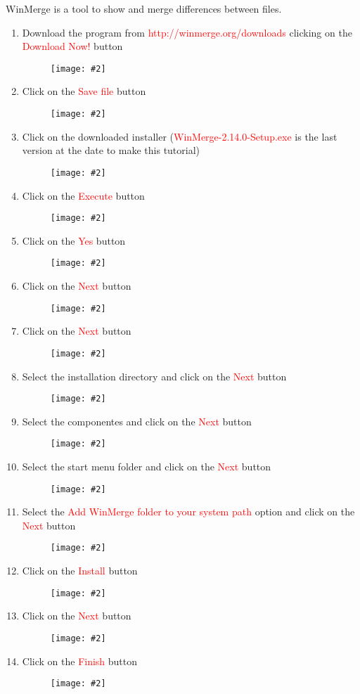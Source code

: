 \documentclass[a4paper]{article}
\newcommand{\FIG}[2]
{
	\begin{figure}[ht!]
	\centering
	\texttt{[image: \#2]}
	\end{figure}
}
\newcommand{\FIGUREB}[1]{\FIG{0.26}{#1}}
\newcommand{\RED}[1] {\textcolor{red}{#1}}
\begin{document}
WinMerge is a tool to show and merge differences between files.

\begin{enumerate}

\item Download the program from \RED{http://winmerge.org/downloads} clicking on
the \RED{Download Now!} button
\FIGUREB{Winmerge-1.png.eps}

\clearpage

\item Click on the \RED{Save file} button
\FIGUREB{Winmerge-2.png.eps}

\item Click on the downloaded installer (\RED{WinMerge-2.14.0-Setup.exe} is the
last version at the date to make this tutorial)
\FIGUREB{Winmerge-3.png.eps}

\clearpage

\item Click on the \RED{Execute} button
\FIGUREB{Winmerge-4.png.eps}

\item Click on the \RED{Yes} button
\FIGUREB{Winmerge-5.png.eps}

\clearpage

\item Click on the \RED{Next} button
\FIGUREB{Winmerge-6.png.eps}

\item Click on the \RED{Next} button
\FIGUREB{Winmerge-7.png.eps}

\clearpage

\item Select the installation directory and click on the \RED{Next} button
\FIGUREB{Winmerge-8.png.eps}

\item Select the componentes and click on the \RED{Next} button
\FIGUREB{Winmerge-9.png.eps}

\clearpage

\item Select the start menu folder and click on the \RED{Next} button
\FIGUREB{Winmerge-10.png.eps}

\item Select the \RED{Add WinMerge folder to your system path} option and click
on the \RED{Next} button
\FIGUREB{Winmerge-11.png.eps}

\clearpage

\item Click on the \RED{Install} button
\FIGUREB{Winmerge-12.png.eps}

\item Click on the \RED{Next} button
\FIGUREB{Winmerge-13.png.eps}

\clearpage

\item Click on the \RED{Finish} button
\FIGUREB{Winmerge-14.png.eps}

\end{enumerate}
\end{document}
